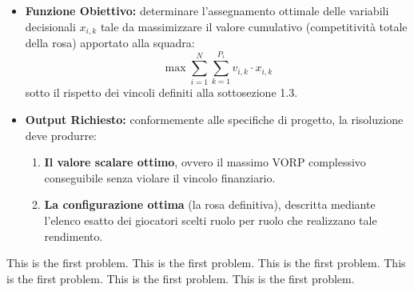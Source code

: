 \documentclass{cisXXX} %
\begin{document}
    \begin{itemize}                                                                                                                           
        \item \textbf{Funzione Obiettivo:} determinare l'assegnamento ottimale delle variabili decisionali $x_{i,k}$ tale da massimizzare il  
  valore cumulativo (competitività totale della rosa) apportato alla squadra:                                                                 
        \[                                                                                                                                    
        \max \sum_{i=1}^N \sum_{k=1}^{P_i} v_{i,k} \cdot x_{i,k}                                                                              
        \]                                                                                                                                    
        sotto il rispetto dei vincoli definiti alla sottosezione 1.3.                                                                         
                                                                                                                                              
        \item \textbf{Output Richiesto:} conformemente alle specifiche di progetto, la risoluzione deve produrre:                             
        \begin{enumerate}                                                                                                                     
            \item \textbf{Il valore scalare ottimo}, ovvero il massimo VORP complessivo conseguibile senza violare il vincolo finanziario.    
            \item \textbf{La configurazione ottima} (la rosa definitiva), descritta mediante l'elenco esatto dei giocatori scelti ruolo per   
  ruolo che realizzano tale rendimento.                                                                                                       
        \end{enumerate}                                                                                                                       
    \end{itemize}



\HWproblem
This is the first problem.
This is the first problem.
This is the first problem.
This is the first problem.
This is the first problem.
This is the first problem.
\end{document}
